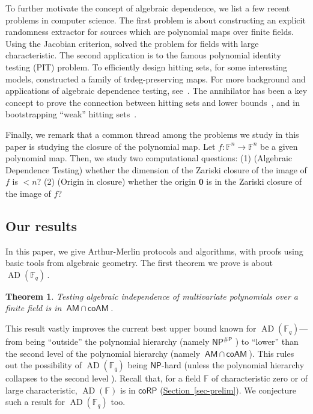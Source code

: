 \documentclass[11pt]{article}
\numberwithin{equation}{section}
\newtheorem{theorem}{Theorem}[section]
\theoremstyle{definition}
\theoremstyle{plain}
\newcommand{\cclass}[1]{\textsf{#1}}
\newcommand{\expref}[2]{\hyperref[#2]{#1~\ref{#2}}}
\newcommand{\F}{\mathbb{F}}
\newcommand{\Pclass}{\cclass{P}\xspace}  %
\newcommand{\NP}{\cclass{NP}\xspace}  %
\newcommand{\coRP}{\cclass{coRP}\xspace}  %
\newcommand{\AM}{\cclass{AM}\xspace}  %
\newcommand{\coAM}{\cclass{coAM}\xspace}  %
\newcommand{\AMcapcoAM}{\AM\,\cap\,\coAM}  %
\DeclareMathOperator{\AD}{\mathrm{AD}\xspace} %
\begin{document}
\smallskip 
To further motivate the concept of algebraic dependence, we list a few recent problems in computer science.
 The first problem is about constructing an explicit randomness extractor for sources which are polynomial maps over finite fields. Using the Jacobian criterion, \cite{DGW09, bib:Dvi09} solved the problem for fields with large characteristic.
 The second application is
%
to   %
the famous polynomial identity testing (PIT) problem. To efficiently design hitting sets, for some interesting models, 
 \cite{BMS13, ASSS11, KS15} constructed a family of trdeg-preserving maps. For more background and applications of algebraic dependence testing, see~\cite{pandey2016algebraic}. The annihilator has been a key concept to prove the connection between hitting sets and lower bounds~\cite{heintz1980testing}, and in  bootstrapping ``weak'' hitting sets~\cite{AGS17}. 

Finally, we remark that a common thread among the problems we study in this paper is studying the closure of the polynomial map.
Let $f:\F^n \to \F^n$ be a given polynomial map. Then, we study two computational questions: (1) (Algebraic Dependence Testing) whether 
the %
dimension of 
%
the Zariski closure of the image of $f$  %
is $< n$? (2) (Origin in closure) whether 
%
the origin $\mathbf{0}$ is in the Zariski closure of the image of $f$? %

%
\subsection{Our results}\label{contrib}
%

In this paper, we give Arthur-Merlin protocols
%
and   %
algorithms, with proofs using basic tools from algebraic geometry. The first theorem we prove is about
%
$\AD(\F_q)$\,.   %

\begin{theorem}\label{thm_amcoam}
%
%
%
Testing algebraic independence of multivariate polynomials over a
finite field is in
%
$\AMcapcoAM$.
%
%
\end{theorem}
 
This result vastly improves the current best upper bound known
for
%
$\AD(\F_q)$---from  %
being ``outside'' the polynomial hierarchy (namely
%
$\NP^{\#\Pclass}$   %
\cite{mittmann2014algebraic}) to ``lower'' than the
%
second level   %
of
the  %
polynomial hierarchy (namely
%
$\AMcapcoAM$).    %
This rules out the possibility
%
of $\AD(\F_q)$   %
being $\NP$-hard (unless
the  %
polynomial hierarchy collapses to the
%
second level   %
\cite{AB09}).  %
Recall that,
%
for a field $\F$ of characteristic zero or of large characteristic,  %
%
$\AD(\F)$   %
is in
%
$\coRP$  %
(\expref{Section}{sec-prelim}). We conjecture such a result for
%
$\AD(\F_q)$    %
too.
\end{document}
